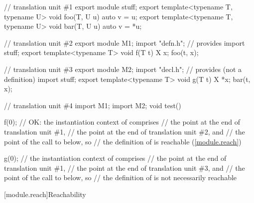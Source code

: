 \begin{std.txt}
\pnum
\begin{example}
\begin{codeblock}
// translation unit \#1
export module stuff;
export template<typename T, typename U> void foo(T, U u) { auto v = u; }
export template<typename T, typename U> void bar(T, U u) { auto v = *u; }

// translation unit \#2
export module M1;
import "defn.h";        // provides 
import stuff;
export template<typename T> void f(T t) {
 X x;
 foo(t, x);
}

// translation unit \#3
export module M2;
import "decl.h";        // provides  (not a definition)
import stuff;
export template<typename T> void g(T t) {
 X *x;
 bar(t, x);
}

// translation unit \#4
import M1;
import M2;
void test() {
  f(0); // OK: the instantiation context of  comprises
        // the point at the end of translation unit \#1,
        // the point at the end of translation unit \#2, and
        // the point of the call to  below, so
        // the definition of  is reachable (\ref{module.reach})

  g(0); // the instantiation context of  comprises
        // the point at the end of translation unit \#1,
        // the point at the end of translation unit \#3, and
        // the point of the call to  below, so
        // the definition of  is not necessarily reachable
}
\end{codeblock}
\end{example}
\end{std.txt}

[module.reach]{Reachability}

